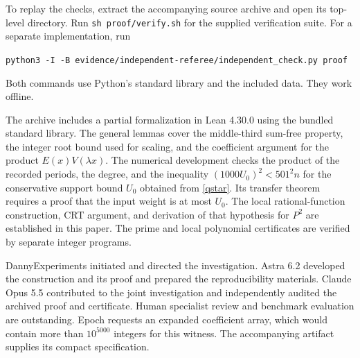 \documentclass[10pt,a4paper,reqno]{amsart}
\begin{document}
To replay the checks, extract the accompanying source archive and open its top-level directory. Run \texttt{sh proof/verify.sh} for the supplied verification suite. For a separate implementation, run
\begin{center}
\texttt{python3 -I -B evidence/independent-referee/independent\_check.py proof}
\end{center}
Both commands use Python's standard library and the included data. They work offline.

The archive includes a partial formalization in Lean 4.30.0 using the bundled standard library. The general lemmas cover the middle-third sum-free property, the integer root bound used for scaling, and the coefficient argument for the product $E(x)V(\lambda x)$. The numerical development checks the product of the recorded periods, the degree, and the inequality $(1000U_0)^2<501^2 n$ for the conservative support bound $U_0$ obtained from \eqref{qstar}. Its transfer theorem requires a proof that the input weight is at most $U_0$. The local rational-function construction, CRT argument, and derivation of that hypothesis for $P^2$ are established in this paper. The prime and local polynomial certificates are verified by separate integer programs.

DannyExperiments initiated and directed the investigation. Astra 6.2 developed the construction and its proof and prepared the reproducibility materials. Claude Opus 5.5 contributed to the joint investigation and independently audited the archived proof and certificate. Human specialist review and benchmark evaluation are outstanding. Epoch requests an expanded coefficient array, which would contain more than $10^{5000}$ integers for this witness. The accompanying artifact supplies its compact specification.



\end{document}
